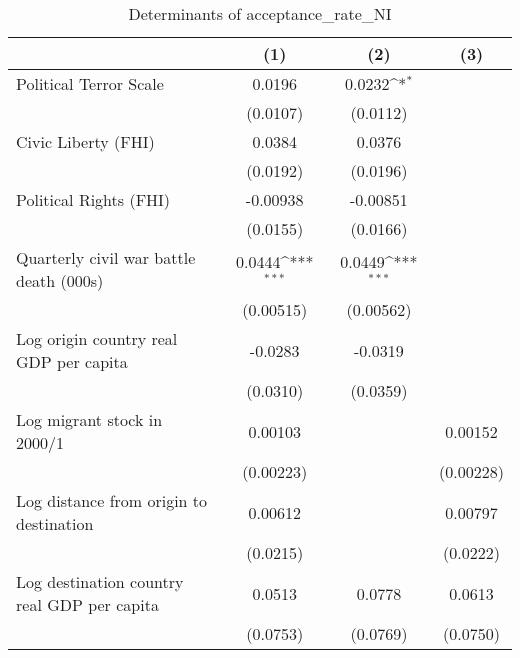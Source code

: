 \begin{table}[htbp]\centering
\def\sym#1{\ifmmode^{#1}\else\(^{#1}\)\fi}
\caption{Determinants of acceptance\_rate\_NI}
\begin{tabular}{l*{3}{c}}
\hline\hline
                    &\multicolumn{1}{c}{(1)}         &\multicolumn{1}{c}{(2)}         &\multicolumn{1}{c}{(3)}         \\
\hline
Political Terror Scale&      0.0196         &      0.0232\sym{*}  &                     \\
                    &    (0.0107)         &    (0.0112)         &                     \\
[1em]
Civic Liberty (FHI) &      0.0384         &      0.0376         &                     \\
                    &    (0.0192)         &    (0.0196)         &                     \\
[1em]
Political Rights (FHI)&    -0.00938         &    -0.00851         &                     \\
                    &    (0.0155)         &    (0.0166)         &                     \\
[1em]
Quarterly civil war battle death (000s)&      0.0444\sym{***}&      0.0449\sym{***}&                     \\
                    &   (0.00515)         &   (0.00562)         &                     \\
[1em]
Log origin country real GDP per capita&     -0.0283         &     -0.0319         &                     \\
                    &    (0.0310)         &    (0.0359)         &                     \\
[1em]
Log migrant stock in 2000/1&     0.00103         &                     &     0.00152         \\
                    &   (0.00223)         &                     &   (0.00228)         \\
[1em]
Log distance from origin to destination&     0.00612         &                     &     0.00797         \\
                    &    (0.0215)         &                     &    (0.0222)         \\
[1em]
Log destination country real GDP per capita&      0.0513         &      0.0778         &      0.0613         \\
                    &    (0.0753)         &    (0.0769)         &    (0.0750)         \\

\end{tabular}
\end{table}
